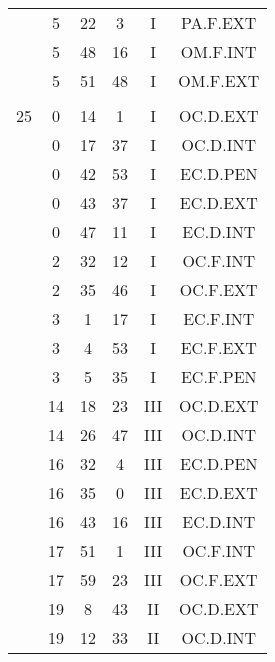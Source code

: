 \documentclass[12pt, a4paper]{article}
\begin{document}
\begin{multicols}{3}
{\begin{tabular}{c c c c c c}
	 	 	 	 & 5 & 22 & 3 & I & PA.F.EXT\\%
	 	 	 	 & 5 & 48 & 16 & I & OM.F.INT\\%
	 	 	 	 & 5 & 51 & 48 & I & OM.F.EXT\\%
	 	 	 	 & & & & & \\%
	 	 	 	25 & 0 & 14 & 1 & I & OC.D.EXT\\%
	 	 	 	 & 0 & 17 & 37 & I & OC.D.INT\\%
	 	 	 	 & 0 & 42 & 53 & I & EC.D.PEN\\%
	 	 	 	 & 0 & 43 & 37 & I & EC.D.EXT\\%
	 	 	 	 & 0 & 47 & 11 & I & EC.D.INT\\%
	 	 	 	 & 2 & 32 & 12 & I & OC.F.INT\\%
	 	 	 	 & 2 & 35 & 46 & I & OC.F.EXT\\%
	 	 	 	 & 3 & 1 & 17 & I & EC.F.INT\\%
	 	 	 	 & 3 & 4 & 53 & I & EC.F.EXT\\%
	 	 	 	 & 3 & 5 & 35 & I & EC.F.PEN\\%
	 	 	 	 & 14 & 18 & 23 & III & OC.D.EXT\\%
	 	 	 	 & 14 & 26 & 47 & III & OC.D.INT\\%
	 	 	 	 & 16 & 32 & 4 & III & EC.D.PEN\\%
	 	 	 	 & 16 & 35 & 0 & III & EC.D.EXT\\%
	 	 	 	 & 16 & 43 & 16 & III & EC.D.INT\\%
	 	 	 	 & 17 & 51 & 1 & III & OC.F.INT\\%
	 	 	 	 & 17 & 59 & 23 & III & OC.F.EXT\\%
	 	 	 	 & 19 & 8 & 43 & II & OC.D.EXT\\%
	 	 	 	 & 19 & 12 & 33 & II & OC.D.INT\\%

\end{tabular}}
\end{multicols}
\end{document}

